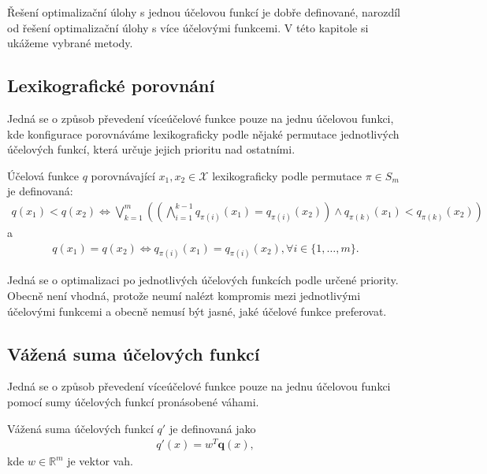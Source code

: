 Řešení optimalizační úlohy s jednou účelovou funkcí je dobře definované,
narozdíl od řešení optimalizační úlohy s více účelovými funkcemi.
V této kapitole si ukážeme vybrané metody.

\subsection{Lexikografické porovnání}

Jedná se o způsob převedení víceúčelové funkce pouze na jednu účelovou funkci, kde konfigurace porovnáváme lexikograficky podle nějaké permutace jednotlivých účelových funkcí,
která určuje jejich prioritu nad ostatními.

\begin{definice}\label{df:lexPorovnani}
  Účelová funkce $q$ porovnávající $x_1, x_2 \in \mathcal{X}$ lexikograficky podle permutace $\pi \in S_m$ je definovaná:
  \begin{align*}
    q(x_1) < q(x_2) \Leftrightarrow \bigvee_{k=1}^m \left ( \left ( \bigwedge_{i=1}^{k-1} q_{\pi(i)}(x_1) = q_{\pi(i)}(x_2) \right ) \land q_{\pi(k)}(x_1) < q_{\pi(k)}(x_2) \right )
  \end{align*}
  a 
  \begin{align*}
    q(x_1) = q(x_2) \Leftrightarrow q_{\pi(i)}(x_1) = q_{\pi(i)}(x_2), \forall i \in \{ 1, \dots, m \}.
  \end{align*}
\end{definice}

Jedná se o optimalizaci po jednotlivých účelových funkcích podle určené priority. 
Obecně není vhodná, protože neumí nalézt kompromis mezi jednotlivými účelovými funkcemi a obecně nemusí být jasné, jaké účelové funkce preferovat.

\subsection{Vážená suma účelových funkcí}\label{kap:vazenaSumaUcelF}

Jedná se o způsob převedení víceúčelové funkce pouze na jednu účelovou funkci pomocí sumy účelových funkcí pronásobené váhami.

\begin{definice}\label{df:vazenaSumaUcelF}
  Vážená suma účelových funkcí $q'$ je definovaná jako
  \begin{align*}
    q'(x) = w^T \mathbf{q}(x),
  \end{align*}
  kde $w \in \mathbb{R}^m$ je vektor vah.
\end{definice}

